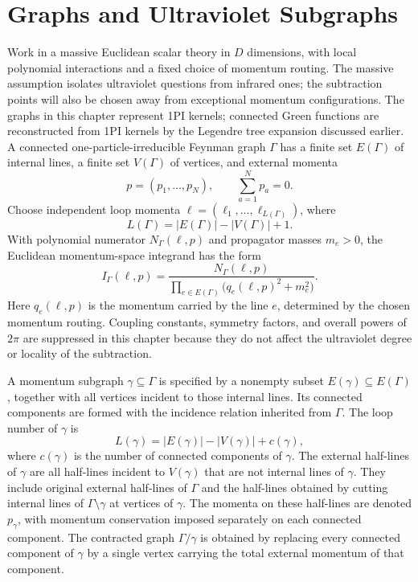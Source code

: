 \section{Graphs and Ultraviolet Subgraphs}

Work in a massive Euclidean scalar theory in \(D\) dimensions, with local
polynomial interactions and a fixed choice of momentum routing.  The massive
assumption isolates ultraviolet questions from infrared ones; the subtraction
points will also be chosen away from exceptional momentum configurations.  The
graphs in this chapter represent 1PI kernels; connected Green functions are
reconstructed from 1PI kernels by the Legendre tree expansion discussed
earlier.  A connected one-particle-irreducible Feynman graph \(\Gamma\) has a
finite set \(E(\Gamma)\) of internal lines, a finite set \(V(\Gamma)\) of
vertices, and external momenta
\[
  p=(p_1,\ldots,p_N),
  \qquad
  \sum_{a=1}^N p_a=0 .
\]
Choose independent loop momenta
\(\ell=(\ell_1,\ldots,\ell_{L(\Gamma)})\), where
\[
  L(\Gamma)=|E(\Gamma)|-|V(\Gamma)|+1 .
\]
With polynomial numerator \(N_\Gamma(\ell,p)\) and propagator masses
\(m_e>0\), the Euclidean momentum-space integrand has the form
\[
  I_\Gamma(\ell,p)
  =
  \frac{N_\Gamma(\ell,p)}
       {\prod_{e\in E(\Gamma)}
        \big(q_e(\ell,p)^2+m_e^2\big)} .
\]
Here \(q_e(\ell,p)\) is the momentum carried by the line \(e\), determined by
the chosen momentum routing.  Coupling constants, symmetry factors, and
overall powers of \(2\pi\) are suppressed in this chapter because they do not
affect the ultraviolet degree or locality of the subtraction.

\begin{definition}\leavevmode\par
A momentum subgraph \(\gamma\subseteq\Gamma\) is specified by a nonempty subset
\(E(\gamma)\subseteq E(\Gamma)\), together with all vertices incident to those
internal lines.  Its connected components are formed with the incidence
relation inherited from \(\Gamma\).  The loop number of \(\gamma\) is
\[
  L(\gamma)=|E(\gamma)|-|V(\gamma)|+c(\gamma),
\]
where \(c(\gamma)\) is the number of connected components of \(\gamma\).
The external half-lines of \(\gamma\) are all half-lines incident to
\(V(\gamma)\) that are not internal lines of \(\gamma\).  They include original
external half-lines of \(\Gamma\) and the half-lines obtained by cutting
internal lines of \(\Gamma\setminus\gamma\) at vertices of \(\gamma\).  The
momenta on these half-lines are denoted \(p_\gamma\), with momentum
conservation imposed separately on each connected component.  The contracted
graph \(\Gamma/\gamma\) is obtained by replacing every connected component of
\(\gamma\) by a single vertex carrying the total external momentum of that
component.
\end{definition}

